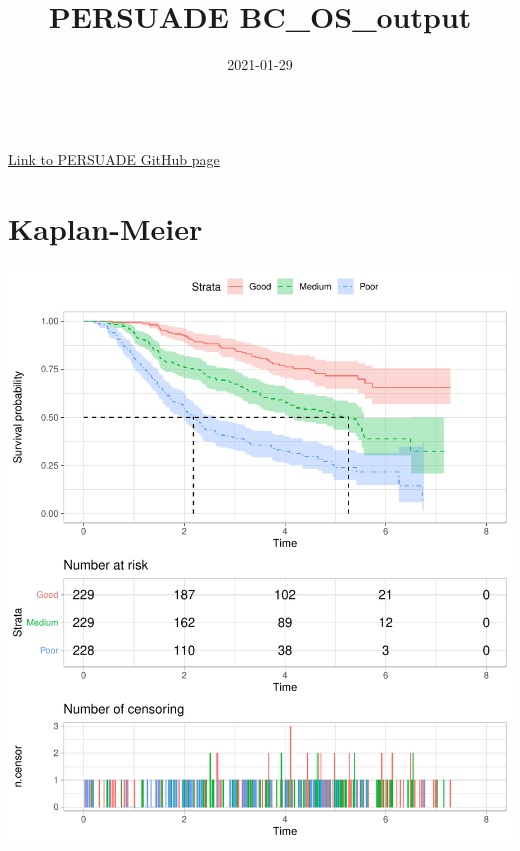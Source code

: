 \documentclass[]{article}
\title{PERSUADE BC\_OS\_output}
\author{}
\date{\vspace{-2.5em}2021-01-29}
\begin{document}
\maketitle

{
\hypersetup{linkcolor=black}
\setcounter{tocdepth}{2}
\tableofcontents
}
~\\
\href{https://github.com/Bram-R/PERSUADE}{Link to PERSUADE GitHub page}
\newpage

\section{Kaplan-Meier}\label{kaplan-meier}

\begin{flushleft}\includegraphics{Images/plot_KM-1} \end{flushleft}
\end{document}
